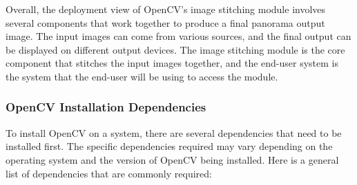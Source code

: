 Overall, the deployment view of OpenCV's image stitching module involves several components that work together to produce a final panorama output image. The input images can come from various sources, and the final output can be displayed on different output devices. The image stitching module is the core component that stitches the input images together, and the end-user system is the system that the end-user will be using to access the module.
\subsubsection{OpenCV Installation Dependencies\label{subsubSection::opencvInstallation}}
To install OpenCV on a system, there are several dependencies that need to be installed first. The specific dependencies required may vary depending on the operating system and the version of OpenCV being installed. Here is a general list of dependencies that are commonly required:
